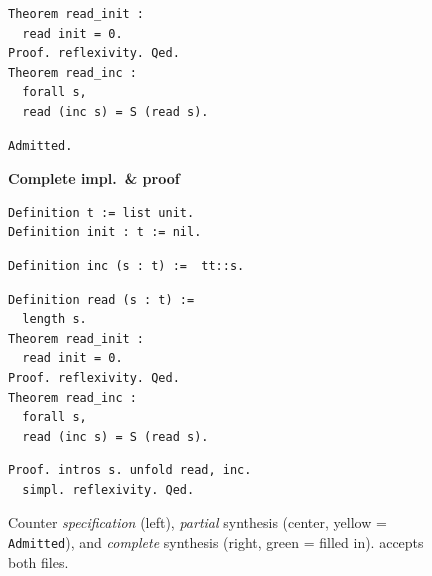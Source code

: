 \begin{figure}[tb]
\begin{minipage}[t]{0.32\textwidth}
\begin{lstlisting}
Theorem read_init :
  read init = 0.
Proof. reflexivity. Qed.
Theorem read_inc :
  forall s,
  read (inc s) = S (read s).
\end{lstlisting}
\begin{lstlisting}[backgroundcolor=\color{partialhi}]
Admitted.
\end{lstlisting}
\end{minipage}\hfill
\begin{minipage}[t]{0.32\textwidth}
\centering
\textbf{Complete impl.\ \& proof}\\[2pt]
\begin{lstlisting}
Definition t := list unit.
Definition init : t := nil.
\end{lstlisting}
\begin{lstlisting}[backgroundcolor=\color{completehi}]
Definition inc (s : t) :=  tt::s.
\end{lstlisting}
\begin{lstlisting}
Definition read (s : t) :=
  length s.
Theorem read_init :
  read init = 0.
Proof. reflexivity. Qed.
Theorem read_inc :
  forall s,
  read (inc s) = S (read s).
\end{lstlisting}
\begin{lstlisting}[backgroundcolor=\color{completehi}]
Proof. intros s. unfold read, inc.
  simpl. reflexivity. Qed.
\end{lstlisting}
\end{minipage}
\caption{Counter \textit{specification} (left), \textit{partial} synthesis (center, yellow = \texttt{Admitted}), and \textit{complete} synthesis (right, green = filled in). \coq{} accepts both files.}
\label{fig:counter-listing}
\end{figure}
